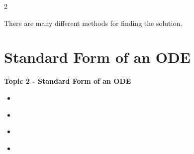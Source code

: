 \documentclass[fleqn]{beamer} %
\newcommand{\sectionIItitle}{Standard Form of an ODE}
\newcommand{\sectionIIsubsectionItitle}{}
\newcommand{\sectionIIsubsectionIItitle}{}
\newcommand{\sectionIIsubsectionIIItitle}{}
\newcommand{\sectionIIsubsectionIVtitle}{}
\begin{document}
\begin{frame}
\begin {multicols}{2}
	
There are many different methods for finding the solution.

\end{multicols} 
 				\btVFill
			\end{frame}


	\section{\sectionIItitle}\label{sectionII}

		\begin{frame}
			\large \textbf{Topic 2 - \sectionIItitle} \vspace{3mm}\\

			\begin{itemize}
				\item \hyperlink{sectionIIsubsectionI}{\sectionIIsubsectionItitle} \vspc %
				\item \hyperlink{sectionIIsubsectionII}{\sectionIIsubsectionIItitle} \vspc %
				\item \hyperlink{sectionIIsubsectionIII}{\sectionIIsubsectionIIItitle} \vspc %
				\item \hyperlink{sectionIIsubsectionIV}{\sectionIIsubsectionIVtitle} \vspc %
			\end{itemize}

		\end{frame}

		\subsection{\sectionIIsubsectionItitle}\label{sectionIIsubsectionI}

			\begin{frame}[label=sectionIIsubsectionI]
				\frametitle{\sectionIIsubsectionItitle}
				\bigskip

  
				\btVFill
			\end{frame}

			\begin{frame}[label=sectionIIsubsectionI]
				\frametitle{\sectionIIsubsectionItitle}
				\bigskip


				\btVFill
			\end{frame}	
\end{document}

